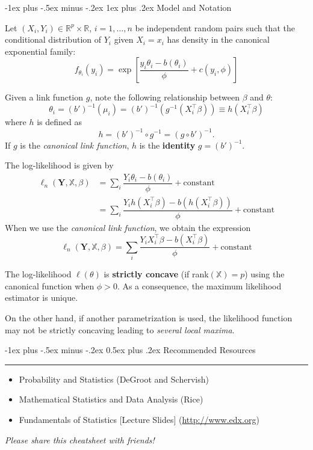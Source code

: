 \documentclass[a4paper, 10pt,landscape]{article}
\makeatletter
\renewcommand{\section}{\@startsection{section}{1}{0mm}%
                                {-1ex plus -.5ex minus -.2ex}%
                                {0.5ex plus .2ex}%
                                {\normalfont\large\bfseries}}
\renewcommand{\subsubsection}{\@startsection{subsubsection}{3}{0mm}%
                                {-1ex plus -.5ex minus -.2ex}%
                                {1ex plus .2ex}%
                                {\normalfont\small\bfseries}}
\makeatother
\begin{document}
\begin{multicols*}{3}
\subsubsection{Model and Notation}
\begin{description}
	\item Let $(X_i,Y_i)\in\mathbb{R}^p\times\mathbb{R}$, $i=1,\dots,n$ be independent random pairs such that the conditional distribution of $Y_i$ given $X_i=x_i$ has density in the canonical exponential family:
	$$f_{\theta_i}(y_i)=\exp\left[\dfrac{y_i\theta_i-b(\theta_i)}{\phi}+c(y_i,\phi)\right]$$
	\item[Back to $\beta$:] Given a link function $g$, note the following relationship between $\beta$ and $\theta$:
	$$\theta_i=(b')^{-1}(\mu_i)=(b')^{-1}\left(g^{-1}(X_i^\intercal\beta)\right)\equiv h\left(X_i^\intercal\beta\right)$$
	where $h$ is defined as $$h=(b')^{-1}\circ g^{-1}=(g\circ b')^{-1}.$$
	If $g$ is the {\it canonical link function}, $h$ is the {\bf identity} $g=(b')^{-1}$.
	\item[Log-likelihood] The log-likelihood is given by
	\begin{align*}
		\ell_n\left(\mathbf{Y},\mathbb{X},\beta\right) & =\sum_{i}\dfrac{Y_i\theta_i-b(\theta_i)}{\phi}+\text{constant}\\
		& = \sum_{i}\dfrac{Y_ih\left(X_i^\intercal\beta\right)-b\left(h\left(X_i^\intercal\beta\right)\right)}{\phi}+\text{constant}
	\end{align*}
	When we use the {\it canonical link function}, we obtain the expression
	$$\ell_n\left(\mathbf{Y},\mathbb{X},\beta\right)=\sum_{i}\dfrac{Y_iX_i^\intercal\beta-b\left(X_i^\intercal\beta\right)}{\phi}+\text{constant}$$
	\item[Strict concavity] The log-likelihood $\ell(\theta)$ is {\bf strictly concave} (if rank$(\mathbb{X})=p$) using the canonical function when $\phi>0$. As a consequence, the maximum likelihood estimator is unique.
	\item On the other hand, if another parametrization is used, the likelihood function may not be strictly concaving leading to {\it several local maxima}.
\end{description}

\section{Recommended Resources} \smallskip \hrule height 1pt \smallskip

\bigskip

\begin{itemize}
\item Probability and Statistics (DeGroot and Schervish)
\item Mathematical Statistics and Data Analysis (Rice)
\item Fundamentals of Statistics [Lecture Slides] (\url{http://www.edx.org})
\end{itemize}

\begin{center}\emph{Please share this cheatsheet with friends!}\end{center}

\end{multicols*}
\end{document}

